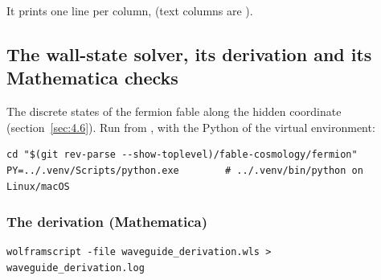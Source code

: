It prints one line per column,  (text columns are ).

\subsection{The wall-state solver, its derivation and its Mathematica checks}
\label{sec:6.6}

The discrete states of the fermion fable along the hidden coordinate  (section~\ref{sec:4.6}). Run from , with the Python of the virtual environment:

\begin{Verbatim}
cd "$(git rev-parse --show-toplevel)/fable-cosmology/fermion"
PY=../.venv/Scripts/python.exe        # ../.venv/bin/python on Linux/macOS
\end{Verbatim}

\subsubsection{The derivation (Mathematica)}
\label{sec:6.6.1}

\begin{Verbatim}
wolframscript -file waveguide_derivation.wls > waveguide_derivation.log
\end{Verbatim}

